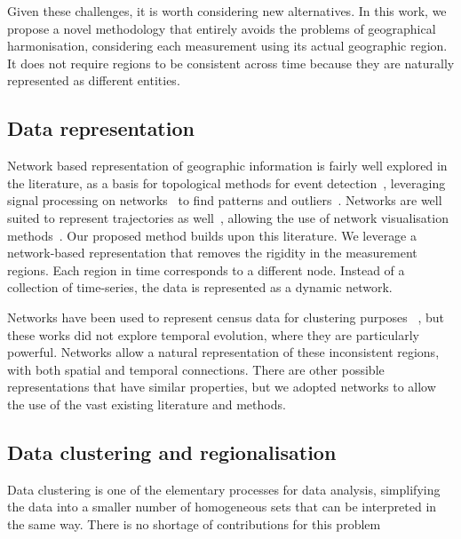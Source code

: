 Given these challenges, it is worth considering new alternatives. In this work,
we propose a novel methodology that entirely avoids the problems of geographical
harmonisation, considering each measurement using its actual geographic region.
It does not require regions to be consistent across time because they are
naturally represented as different entities. 

\subsection{Data representation}

Network based representation of geographic information is fairly well explored
in the literature, as a basis for topological methods for event
detection~\citep{Doraiswamy2014}, leveraging signal processing on
networks~\citep{shuman2013emerging,sandryhaila2013discrete} to find patterns and
outliers~\citep{Valdivia2015,Dias2015,Alce2018}. Networks are well suited to
represent trajectories as
well~\citep{VonLandesberger2016,Huang2016,chen2015survey}, allowing the use of
network visualisation methods~\citep{Vehlow2015,Beck2014}. Our proposed method
builds upon this literature. We leverage a network-based representation that
removes the rigidity in the measurement regions. Each region in time corresponds
to a different node. Instead of a collection of time-series, the data is
represented as a dynamic network. 

Networks have been used to represent census data for clustering purposes
~\citep{Dias2015,Setiadi2017}, but these works did not explore temporal
evolution, where they are particularly powerful. Networks allow a natural
representation of these inconsistent regions, with both spatial and temporal
connections. There are other possible representations that have similar
properties, but we adopted networks to allow the use of the vast existing
literature and methods.


\subsection{Data clustering and regionalisation}

Data clustering is one of the elementary processes for data analysis,
simplifying the data into a smaller number of homogeneous sets that can be
interpreted in the same way. There is no shortage of contributions for this
problem~\citep{Fahad2014}


